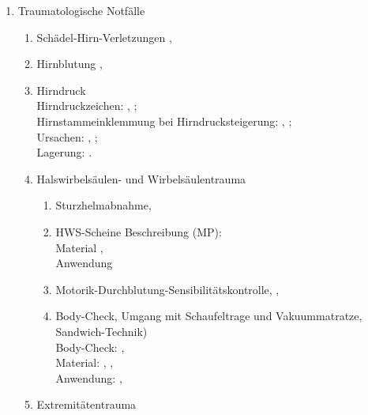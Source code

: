   \begin{enumerate}
    \item Traumatologische Notfälle
    \begin{enumerate}
      \item      Schädel-Hirn-Verletzungen \dotfill  {}, 
      \item      Hirnblutung \dotfill {},
      \item      Hirndruck
      \\
      Hirndruckzeichen:  \dotfill {},
      ;
      \\
      Hirnstammeinklemmung bei
      Hirndrucksteigerung:  \dotfill {},
      ;
      \\
      Ursachen: \dotfill
      , ;
      \\
      Lagerung:  \dotfill {}.
      \item
      Halswirbelsäulen- und  Wirbelsäulentrauma
      \begin{enumerate}
        \item      Sturzhelmabnahme, \dotfill {}
        \item      HWS-Scheine Beschreibung (MP):
        \\
        Material  \dotfill {}, \\
        Anwendung  \dotfill {}
        \item
        Motorik-Durchblutung-Sensibilitätskontrolle, \dotfill 	{},
       \item      Body-Check, Umgang mit  Schaufeltrage und
       Vakuummatratze, Sandwich-Technik)\\
       Body-Check:  \dotfill {}, \\
       Material: \dotfill
       ,
       ,
       \\ Anwendung: \dotfill
       ,
      \end{enumerate}
      
      \item Extremitätentrauma
      \begin{enumerate}
        

\end{enumerate}
\end{enumerate}
\end{enumerate}

